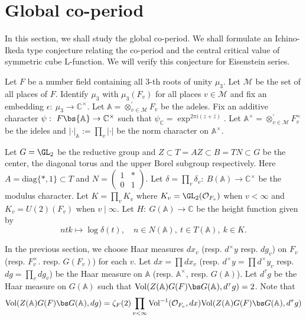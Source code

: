 \documentclass[11pt,reqno]{amsart}
\newcommand{\BA}{{\mathbb {A}}} \newcommand{\BB}{{\mathbb {B}}}
\newcommand{\BC}{{\mathbb {C}}} \newcommand{\BD}{{\mathbb {D}}}
\newcommand{\CM}{{\mathcal {M}}} \newcommand{\CN}{{\mathcal {N}}}
\newcommand{\CO}{{\mathcal {O}}} \newcommand{\CP}{{\mathcal {P}}}
\newcommand{\diag}{{\mathrm{diag}}}
\newcommand{\Vol}{{\mathrm{Vol}}}\newcommand{\vol}{{\mathrm{vol}}}
\theoremstyle{plain}
\theoremstyle{remark} \newtheorem{remark}[thm]{Remark}
\theoremstyle{definition} \newtheorem{exercise}[thm]{Exercise}
\theoremstyle{definition} \newtheorem{example}[thm]{Example} \newtheorem{condition}[thm]{Condition}
\numberwithin{equation}{section}
\renewcommand{\-}{\text{--}}
\begin{document}
\section{Global co-period}
In this section, we shall study the global co-period. We shall formulate an Ichino-Ikeda type conjecture relating the co-period  and the central critical value of symmetric cube L-function. We will verify this conjecture for Eisenstein series.

Let  $F$ be a number field containing all $3$-th roots of unity $\mu_3$. Let $\CM$ be the set of all places of $F$.  Identify $\mu_3$ with  $\mu_3(F_v)$ for all places $v\in\CM$ and fix an embedding $\epsilon:\ \mu_3\to\BC^\times$. Let $\BA=\otimes_{v\in\CM}^\prime F_v$ be the adeles.  Fix an additive character $\psi:\ F\bs\BA\to\BC^\times$  such that $\psi_{\BC}=\exp^{2\pi i(z+\bar{z})}$. Let $\BA^\times=\otimes_{v\in\CM}^\prime F_v^\times$ be the ideles and $|\cdot|_\BA:=\prod_v |\cdot|$ be the norm character on $\BA^\times$. 


Let $G=\GL_2$ be the reductive group and $Z\subset T=AZ\subset B=TN\subset G$ be the center, the diagonal torus and the upper Borel subgroup respectively. Here  $A=\diag\{*,1\}\subset T$ and $N=\begin{pmatrix}1 & * \\ 0 &1\end{pmatrix}$. Let $\delta=\prod_v\delta_v:\ B(\BA)\to\BC^\times$
be the modulus character. Let $K=\prod_v K_v$ where $K_v=\GL_2(\CO_{F_v})$ when $v<\infty$ and $K_v=U(2)(F_v)$ when $v\mid \infty$. Let $H:\ G(\BA)\to \BC$ be the height function given by 
\[ntk\mapsto\log\delta(t),\quad n\in N(\BA),\ t\in T(\BA),\ k\in K.\]

In the previous section, we choose Haar measures $d x_v$ (resp. $d^\times y$ resp. $d g_v$) on $F_v$ (resp. $F_v^\times$. resp. $G(F_v)$) for each $v$. Let $dx=\prod dx_v$ (resp.  $d^\times y=\prod d^\times y_v$ resp.  $dg=\prod_v dg_v$) be the Haar measure on $\BA$ (resp. $\BA^\times$, resp.  $G(\BA)$).  Let $d^\tau g$ be the Haar measure on $G(\BA)$ such that $\Vol(Z(\BA)G(F)\bs G(\BA),d^\tau g)=2$. 
Note that \[\Vol(Z(\BA)G(F)\bs G(\BA),d g)=\zeta_F(2)\prod_{v<\infty}\Vol^{-1}(\CO_{F_v},dx)\Vol(Z(\BA)G(F)\bs G(\BA),d^\tau g)\] 
\end{document}
